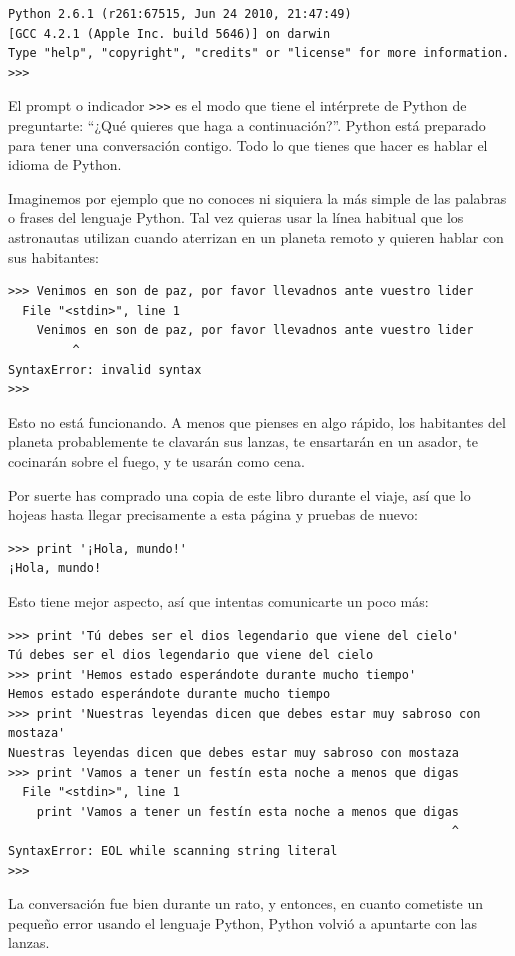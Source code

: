 
\beforeverb
\begin{verbatim}
Python 2.6.1 (r261:67515, Jun 24 2010, 21:47:49) 
[GCC 4.2.1 (Apple Inc. build 5646)] on darwin
Type "help", "copyright", "credits" or "license" for more information.
>>> 
\end{verbatim}
\afterverb
%
El prompt o indicador {\tt >>>} es el modo que tiene el intérprete de Python de preguntarte:
``¿Qué quieres que haga a continuación?''. Python está preparado para tener una conversación contigo. Todo lo que tienes que hacer es hablar el idioma de Python.

Imaginemos por ejemplo que no conoces ni siquiera la más simple de las palabras o frases del lenguaje Python. Tal vez quieras usar la línea habitual que los astronautas utilizan cuando aterrizan en un planeta remoto y quieren hablar con sus habitantes:

\beforeverb
\begin{verbatim}
>>> Venimos en son de paz, por favor llevadnos ante vuestro lider
  File "<stdin>", line 1
    Venimos en son de paz, por favor llevadnos ante vuestro lider
         ^
SyntaxError: invalid syntax
>>> 
\end{verbatim}
\afterverb
%
Esto no está funcionando. A menos que pienses en algo rápido,
los habitantes del planeta probablemente te clavarán sus lanzas,
te ensartarán en un asador, te cocinarán sobre el fuego, y te usarán como cena.

Por suerte has comprado una copia de este libro durante el viaje, así que lo hojeas
hasta llegar precisamente a esta página y pruebas de nuevo:

\beforeverb
\begin{verbatim}
>>> print '¡Hola, mundo!'
¡Hola, mundo!
\end{verbatim}
\afterverb
%
Esto tiene mejor aspecto, así que intentas comunicarte un poco
más:

\beforeverb
\begin{verbatim}
>>> print 'Tú debes ser el dios legendario que viene del cielo'
Tú debes ser el dios legendario que viene del cielo
>>> print 'Hemos estado esperándote durante mucho tiempo'
Hemos estado esperándote durante mucho tiempo
>>> print 'Nuestras leyendas dicen que debes estar muy sabroso con mostaza'
Nuestras leyendas dicen que debes estar muy sabroso con mostaza
>>> print 'Vamos a tener un festín esta noche a menos que digas
  File "<stdin>", line 1
    print 'Vamos a tener un festín esta noche a menos que digas
                                                              ^
SyntaxError: EOL while scanning string literal
>>> 
\end{verbatim}
\afterverb
%
La conversación fue bien durante un rato, y entonces, en cuanto
cometiste un pequeño error usando el lenguaje Python, Python
volvió a apuntarte con las lanzas.

